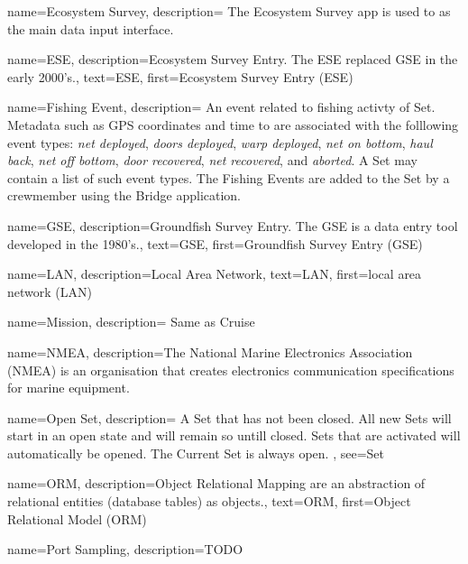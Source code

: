  {
  name=Ecosystem Survey,
  description={
    The Ecosystem Survey app is used to as the main data input interface.
    }
}

 {
  name=ESE,
  description={Ecosystem Survey Entry. The ESE replaced \gls{GSE} in the early 2000's.},
  text={ESE},
  first={Ecosystem Survey Entry (ESE)}
}

 {
  name=Fishing Event,
  description={
    An event related to fishing activty of \gls{Set}.
    Metadata such as GPS coordinates and time to are associated with the folllowing event types:
    \emph{net deployed},
    \emph{doors deployed},
    \emph{warp deployed},
    \emph{net on bottom},
    \emph{haul back},
    \emph{net off bottom},
    \emph{door recovered},
    \emph{net recovered},
    and \emph{aborted}.
    A \gls{Set} may contain a list of such event types.
    The Fishing Events are added to the \gls{Set} by a crewmember using the \gls{Bridge} application.
  }
}

 {
  name=GSE,
  description={Groundfish Survey Entry. The GSE is a data entry tool developed in the 1980's.},
  text={GSE},
  first={Groundfish Survey Entry (GSE)}
}

 {
  name=LAN,
  description={Local Area Network},
  text={LAN},
  first={local area network (LAN)}
}

 {
  name=Mission,
  description={
    Same as \gls{Cruise}
  }
}

 {
  name=NMEA,
  description={The National Marine Electronics Association (NMEA) is an organisation that creates 
  electronics communication specifications for marine equipment.
  }
}

 {
  name=Open Set,
  description={
    A \gls{Set} that has not been closed. All new Sets will start in an open state and will remain so untill closed. 
    Sets that are activated will automatically be opened. 
    The \gls{Current Set} is always open.
  },
  see={Set}
}

 {
  name=ORM,
  description={Object Relational Mapping are an abstraction of relational entities (database tables) as objects.},
  text={ORM},
  first={Object Relational Model (ORM)}
}

 {
  name=Port Sampling,
  description={TODO}
}

